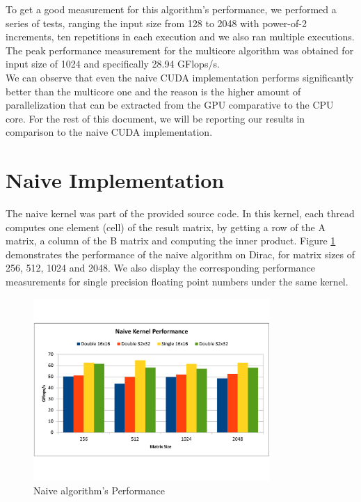 \documentclass[paper=a4, fontsize=11pt]{scrartcl} %
\numberwithin{equation}{section} %
\numberwithin{figure}{section} %
\numberwithin{table}{section} %
\begin{document}
To get a good measurement for this algorithm's performance, we performed a series of tests, ranging the input size from  128 to 2048 with power-of-2 increments, ten repetitions in each execution and we also ran multiple executions. The peak performance measurement for the multicore algorithm was obtained for input size of 1024 and specifically 28.94 GFlops/s. \\

We can observe that even the naive CUDA implementation performs significantly better than the multicore one and the reason is the higher amount of parallelization that can be extracted from the GPU comparative to the CPU core. For the rest of this document, we will be reporting our results in comparison to the naive CUDA implementation.

\section{\textbf{Naive Implementation}}
The naive kernel was part of the provided source code. In this kernel, each thread computes one element (cell) of the result matrix, by getting a row of the A matrix, a column of the B matrix and computing the inner product. Figure \ref{fig:naive} demonstrates the performance of the naive algorithm on Dirac, for matrix sizes of 256, 512, 1024 and 2048. We also display the corresponding performance measurements for single precision floating point numbers under the same kernel.\\

\begin{figure}[h]
  \centering
    \includegraphics[width=0.8\textwidth]{figures/naive.pdf}
    \caption{Naive algorithm's Performance}
    \label{fig:naive}
\end{figure}
\end{document}
